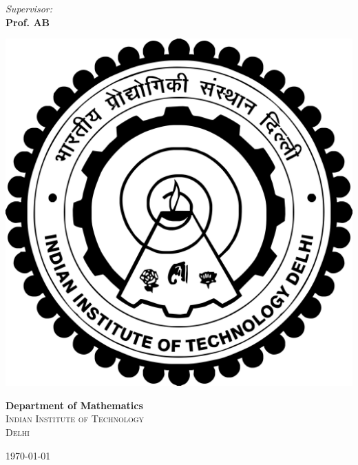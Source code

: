 \documentclass[12pt]{article}
\begin{document}
\begin{titlepage}
\vspace{1mm}

\begin{center}
\emph{Supervisor:} \\
\textbf{Prof. AB}
\end{center}


\includegraphics[scale=0.05]{iitd.png}\\[0.5cm]

\begin{center}
\textbf{Department of Mathematics}\\[1.cm]
\textsc{\large Indian Institute of Technology}\\[1.cm] %
\textsc{\large Delhi}\\[1.cm]
\end{center}
{\large \today}\\[2cm] %


\end{titlepage}
\end{document}
